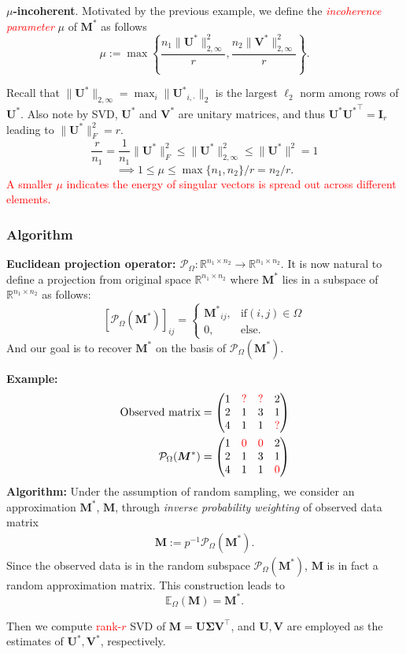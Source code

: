 \documentclass[override]{beamer} %
\theoremstyle{remark}
\newcommand{\bs}[1]{{\boldsymbol{#1}^*}}
\newcommand{\bb}[1]{{\boldsymbol {#1}}}
\def\red{\textcolor{red}}
\begin{document}
\begin{frame}
\newpage
\noindent \textbf{$\mu$-incoherent}.
Motivated by the previous example, we define the \red{\textit{incoherence parameter}} $\mu$ of $\bs M$ as follows
\[
\mu:= \max\left\{
\frac{n_1\|\bs U\|_{2,\infty}^2}{r},
 \frac{n_2\|\bs V\|_{2,\infty}^2}{r}
 \right\}.
\]

Recall that 
$\|\bs U\|_{2,\infty} = \max_i\|\bs U_{i,\cdot}\|_2$ is the largest $\ell_2$ norm among rows of $\bs U$.
Also note by SVD, $\bs U$ and $\bs V$ are unitary matrices, and thus $\bs U\bs U^\top = \mathbf I_r$ leading to $\|\bs U\|_F^2 = r$.
\[
\frac{r}{n_1} = \frac{1}{n_1}\|\bs U\|_F^2
\leq 
\|\bs U\|_{2,\infty}^2
\leq\|\bs U\|^2 = 1
\]
\[
\implies
1\leq \mu\leq \max\{n_1, n_2\} /r = n_2/r.
\]
\red{A smaller $\mu$ indicates the energy of singular vectors is spread out across different elements.}
\end{frame}


\begin{frame}
\frametitle{Algorithm}

\noindent \textbf{Euclidean projection operator: $\mathcal P_\Omega: \mathbb R^{n_1\times n_2}\to \mathbb R^{n_1\times n_2}$}.
It is now natural to define a projection from original space $\mathbb R^{n_1\times n_2}$ where $\bs M$ lies in a subspace of $\mathbb R^{n_1\times n_2}$ as follows:
$$
[\mathcal P_{\Omega} (\bs M)]_{ij} = 
\begin{cases}
\bs M_{ij}, &\mathrm{ if } (i,j)\in\Omega\\
0, &\mathrm{ else.}
\end{cases}
$$
And our goal is to recover $\bs M$ on the basis of $\mathcal P_\Omega (\bs M)$.

\textbf{Example:}
\begin{align*}
    \text{Observed matrix}
    =
    \begin{pmatrix}
    1 & \red{?} & \red{?} & 2 \\
    2& 1 & 3& 1\\
    4 & 1& 1& \red{?}
    \end{pmatrix}
    \\
     \mathcal P_\Omega(\bs M)
    =
    \begin{pmatrix}
    1 & \red{0} & \red{0} & 2 \\
    2& 1 & 3& 1\\
    4 & 1& 1& \red{0}
    \end{pmatrix}
\end{align*}
\newpage 
\textbf{Algorithm:} 
Under the assumption of random sampling, we consider an approximation $\bs M$, $\bb M$, through \textit{inverse probability weighting} of observed data matrix
\begin{align}
    \bb{M}:= p^{-1} \mathcal P_\Omega (\bs {M}).
\end{align}
Since the observed data is in the random subspace $\mathcal P_\Omega (\bs {M})$, 
$\bb M$ is in fact a random approximation matrix.
This construction leads to
$$\mathbb E_\Omega (\bb M) = \bs M.$$

Then
we compute \red{rank-$r$} SVD of $\bb M = \bb U \bb \Sigma \bb V^\top$,
and 
$\bb U, \bb V$ are employed as the estimates of 
$\bs U, \bs V$, respectively.
\end{frame}
\end{document}
